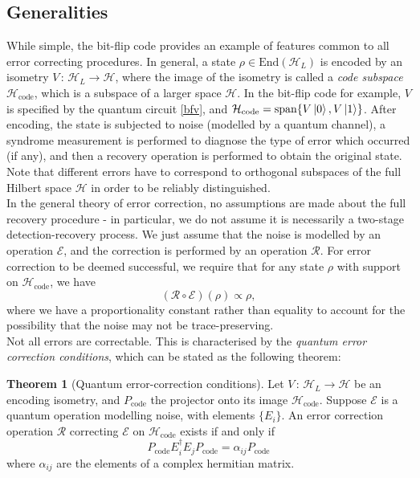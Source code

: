 \documentclass[12pt,a4paper]{report}
\numberwithin{equation}{section}
\newcommand{\Pc}{P_{\text{code}}}
\newcommand{\Hcode}{\mathcal{H}_{\text{code}}}
\theoremstyle{definition}
\theoremstyle{theorem}
\newtheorem{theorem}{Theorem}[section]
\theoremstyle{theorem}
\theoremstyle{example}
\theoremstyle{definition}
\begin{document}
\subsection{Generalities}
While simple, the bit-flip code provides an example of features common to all error correcting procedures. In general, a state $\rho\in\text{End}(\mathcal{H}_{L})$ is encoded by an isometry $V\,:\,\mathcal{H}_{L}\to\mathcal{H}$, where the image of the isometry is called a \textit{code subspace} $\Hcode$, which is a subspace of a larger space $\mathcal{H}$. In the bit-flip code for example, $V$ is specified by the quantum circuit \ref{bfv}, and  $\Hcode=\text{span}\{V\ket{0},V\ket{1}\}$. After encoding, the state is subjected to noise (modelled by a quantum channel),  a syndrome measurement is performed to diagnose the type of error which occurred (if any), and then a recovery operation is performed to obtain the original state. Note that different errors have to correspond to orthogonal subspaces of the full Hilbert space $\mathcal{H}$ in order to be reliably distinguished.\\
In the general theory of error correction, no assumptions are made about the full recovery procedure - in particular, we do not assume it is necessarily a two-stage detection-recovery process. We just assume that the noise is modelled by an operation $\mathcal{E}$, and the correction is performed by an operation $\mathcal{R}$. For error correction to be deemed successful, we require that for any state $\rho$ with support on $\Hcode$, we have
\begin{equation}
	(\mathcal{R}\circ\mathcal{E})(\rho)\propto\rho,
\end{equation}
where we have a proportionality constant rather than equality to account for the possibility that the noise may not be trace-preserving.\\
Not all errors are correctable. This is characterised by the \textit{quantum error correction conditions}, which can be stated as the following theorem:
\begin{theorem}[Quantum error-correction conditions]\label{QECC}
	Let $V\,:\,\mathcal{H}_{L}\to\mathcal{H}$ be an encoding isometry, and $\Pc$ the projector onto its image $\Hcode$. Suppose $\mathcal{E}$ is a quantum operation modelling noise, with elements $\{E_{i}\}$. An error correction operation $\mathcal{R}$ correcting $\mathcal{E}$ on $\Hcode$ exists if and only if
	\begin{equation}\label{QECC1}
		\Pc E_{i}^{\dagger}E_{j}\Pc=\alpha_{ij}\Pc
	\end{equation}
	where $\alpha_{ij}$ are the elements of a complex hermitian matrix.
\end{theorem}
\end{document}
